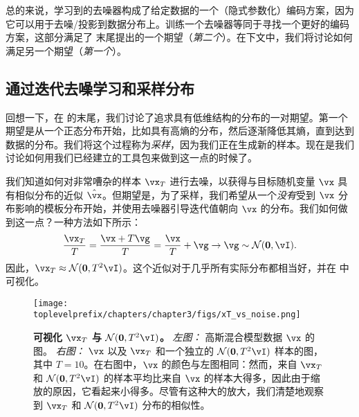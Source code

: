 \documentclass[../../book-main_zh.tex]{subfiles}
\begin{document}
总的来说，学习到的去噪器构成了给定数据的一个（隐式参数化）编码方案，因为它可以用于去噪/投影到数据分布上。训练一个去噪器等同于寻找一个更好的编码方案，这部分满足了  末尾提出的一个期望（\textit{第二个}）。在下文中，我们将讨论如何满足另一个期望（\textit{第一个}）。


\subsection{通过迭代去噪学习和采样分布}\label{sub:sampling_denoising}

回想一下，在  的末尾，我们讨论了追求具有低维结构的分布的一对期望。第一个期望是从一个正态分布开始，比如具有高熵的分布，然后逐渐降低其熵，直到达到数据的分布。我们将这个过程称为\textit{采样}，因为我们正在生成新的样本。现在是我们讨论如何用我们已经建立的工具包来做到这一点的时候了。

我们知道如何对非常嘈杂的样本 \(\vx_{T}\) 进行去噪，以获得与目标随机变量 \(\vx\) 具有相似分布的近似 \(\hat{\vx}\)。但期望是，为了采样，我们希望从一个\textit{没有}受到 \(\vx\) 分布影响的模板分布开始，并使用去噪器引导迭代值朝向 \(\vx\) 的分布。我们如何做到这一点？一种方法如下所示：
\begin{equation}\label{eq:ve_converge_to_large_gaussian}
	\frac{\vx_{T}}{T} = \frac{\vx + T\vg}{T} = \frac{\vx}{T} + \vg \to \vg \sim \dNorm(\vzero, \vI).
\end{equation}
因此，\(\vx_{T} \approx \dNorm(\vzero, T^{2}\vI)\)。这个近似对于几乎所有实际分布都相当好，并在  中可视化。
\begin{figure}
	\centering 
	\texttt{[image: \\toplevelprefix/chapters/chapter3/figs/xT\_vs\_noise.png]}
	\caption{\small\textbf{可视化 \(\vx_{T}\) 与 \(\dNorm(\vzero, T^{2}\vI)\)。} \textit{左图：} 高斯混合模型数据 \(\vx\) 的图。 \textit{右图：} \(\vx\) 以及 \(\vx_{T}\) 和一个独立的 \(\dNorm(\vzero, T^{2}\vI)\) 样本的图，其中 \(T = 10\)。在右图中，\(\vx\) 的颜色与左图相同：然而，来自 \(\vx_{T}\) 和 \(\dNorm(\vzero, T^{2}\vI)\) 的样本平均比来自 \(\vx\) 的样本大得多，因此由于缩放的原因，它看起来小得多。尽管有这种大的放大，我们清楚地观察到 \(\vx_{T}\) 和 \(\dNorm(\vzero, T^{2}\vI)\) 分布的相似性。}
	\label{fig:xT_vs_noise}
\end{figure}
\end{document}
